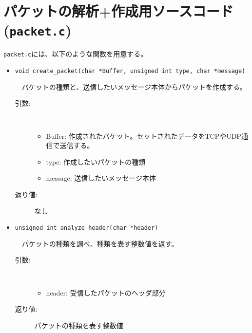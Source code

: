 \documentclass[uplatex,dvipdfmx,11pt,a4paper]{jsarticle} %
\begin{document}
\section{パケットの解析+作成用ソースコード({\tt packet.c})}
{\tt packet.c}には、以下のような関数を用意する。
    

\begin{itemize}
    \item {\tt void create\_packet(char *Buffer, unsigned int type, char *message)}

        　パケットの種類と、送信したいメッセージ本体からパケットを作成する。
        \begin{description}
            \item[引数:] \ 

                \begin{itemize}
                        \item Buffer: 作成されたパケット。セットされたデータをTCPやUDP通信で送信する。
                        \item type: 作成したいパケットの種類
                        \item message: 送信したいメッセージ本体
                \end{itemize}
            \item[返り値:] なし
            \newline
        \end{description}

    \item {\tt unsigned int analyze\_header(char *header)}

        　パケットの種類を調べ、種類を表す整数値を返す。
        \begin{description}
            \item[引数:] \ 

                \begin{itemize}
                        \item header: 受信したパケットのヘッダ部分
                \end{itemize}
            \item[返り値:] パケットの種類を表す整数値
        \end{description}
\end{itemize}
\end{document}
